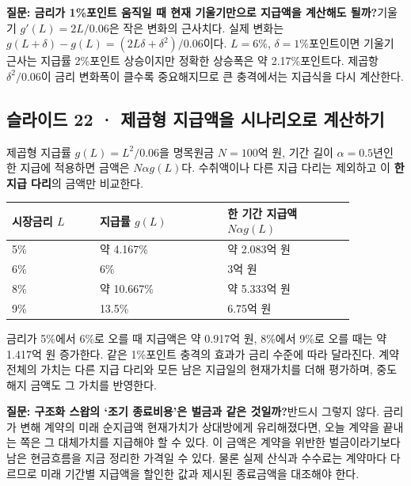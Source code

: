 \documentclass[11pt,a4paper]{article}
\begin{document}
\par\medskip\noindent\textbf{질문: 금리가 1\%포인트 움직일 때 현재 기울기만으로 지급액을 계산해도 될까?}\quad 기울기 $g'(L)=2L/0.06$은 작은 변화의 근사치다. 실제 변화는 $g(L+\delta)-g(L)=(2L\delta+\delta^2)/0.06$이다. $L=6\%$, $\delta=1\%$포인트이면 기울기 근사는 지급률 2\%포인트 상승이지만 정확한 상승폭은 약 2.17\%포인트다. 제곱항 $\delta^2/0.06$이 금리 변화폭이 클수록 중요해지므로 큰 충격에서는 지급식을 다시 계산한다.\par

\subsection{슬라이드 22 · 제곱형 지급액을 시나리오로 계산하기}
제곱형 지급률 $g(L)=L^2/0.06$을 명목원금 $N=100$억 원, 기간 길이 $\alpha=0.5$년인 한 지급에 적용하면 금액은 $N\alpha g(L)$다. 수취액이나 다른 지급 다리는 제외하고 이 \textbf{한 지급 다리}의 금액만 비교한다.\par

\begin{center}\small\begin{tabular}{p{0.22\linewidth}p{0.32\linewidth}p{0.32\linewidth}}\hline
시장금리 $L$ & 지급률 $g(L)$ & 한 기간 지급액 $N\alpha g(L)$ \\ \hline
5\% & 약 4.167\% & 약 2.083억 원 \\
6\% & 6\% & 3억 원 \\
8\% & 약 10.667\% & 약 5.333억 원 \\
9\% & 13.5\% & 6.75억 원 \\
\hline\end{tabular}\end{center}\normalsize

금리가 5\%에서 6\%로 오를 때 지급액은 약 0.917억 원, 8\%에서 9\%로 오를 때는 약 1.417억 원 증가한다. 같은 1\%포인트 충격의 효과가 금리 수준에 따라 달라진다. 계약 전체의 가치는 다른 지급 다리와 모든 남은 지급일의 현재가치를 더해 평가하며, 중도해지 금액도 그 가치를 반영한다.\par

\par\medskip\noindent\textbf{질문: 구조화 스왑의 ‘조기 종료비용’은 벌금과 같은 것일까?}\quad 반드시 그렇지 않다. 금리가 변해 계약의 미래 순지급액 현재가치가 상대방에게 유리해졌다면, 오늘 계약을 끝내는 쪽은 그 대체가치를 지급해야 할 수 있다. 이 금액은 계약을 위반한 벌금이라기보다 남은 현금흐름을 지금 정리한 가격일 수 있다. 물론 실제 산식과 수수료는 계약마다 다르므로 미래 기간별 지급액을 할인한 값과 제시된 종료금액을 대조해야 한다.\par
\end{document}
